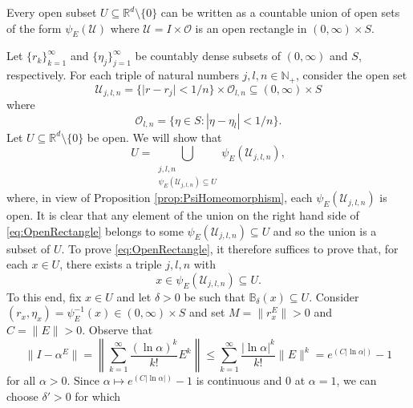 \documentclass[smallextended]{svjour3}
\theoremstyle{remark}
\renewenvironment{proof}[1][\proofname]{\renewcommand\xproofname{#1}\xproof}{\endxproof}
\begin{document}
\begin{lemma}\label{lem:OpenRectangle}
Every open subset $U\subseteq \mathbb{R}^d\setminus\{0\}$ can be written as a countable union of open sets of the form $\psi_E(\mathcal{U})$ where $\mathcal{U}=I\times\mathcal{O}$ is an open rectangle in $(0,\infty)\times S$.
\end{lemma}


\begin{proof}
Let $\{r_k\}_{k=1}^\infty$ and $\{\eta_j\}_{j=1}^\infty$ be countably dense subsets of $(0,\infty)$ and $S$, respectively.  For each triple of natural numbers $j,l,n\in\mathbb{N}_+$, consider the open set
\begin{equation*}
\mathcal{U}_{j,l,n}=\{ \vert r - r_j \vert < 1/n \}\times \mathcal{O}_{l,n}\subseteq (0,\infty)\times S
\end{equation*}
where
\begin{equation*}
\mathcal{O}_{l,n}=\{\eta\in S: |\eta-\eta_l|<1/n\}.
\end{equation*}
Let $U\subseteq \mathbb{R}^d\setminus \{0\}$ be open. We will show that
\begin{equation}\label{eq:OpenRectangle}
U=\bigcup_{\substack{j,l,n\\ \psi_E(\mathcal{U}_{j,l,n})\subseteq U}}\psi_E(\mathcal{U}_{j,l,n}),
\end{equation}
where, in view of Proposition \ref{prop:PsiHomeomorphism}, each $\psi_E(\mathcal{U}_{j,l,n})$ is open. It is clear that any element of the union on the right hand side of \eqref{eq:OpenRectangle} belongs to some $\psi_E(\mathcal{U}_{j,l,n}) \subseteq U$ and so the union is a subset of $U$. To prove \eqref{eq:OpenRectangle}, it therefore suffices to prove that, for each $x\in U$, there exists a triple $j,l,n$ with
\begin{equation*}
x\in\psi_E(\mathcal{U}_{j,l,n})\subseteq U.
\end{equation*}
To this end, fix $x\in U$ and let $\delta>0$ be such that $\mathbb{B}_\delta(x)\subseteq U$. Consider $(r_x,\eta_x)=\psi_E^{-1}(x)\in (0,\infty)\times S$ and set $M=\|r_x^E\|>0$ and $C=\|E\|>0$. Observe that 
\begin{equation*}
\|I-\alpha^E\|=\left\|\sum_{k=1}^\infty \frac{(\ln \alpha)^k}{k!} E^k\right\|\leq \sum_{k=1}^\infty \frac{|\ln \alpha|^k}{k!} \|E\|^k=e^{(C|\ln \alpha|)}-1
\end{equation*}
for all $\alpha>0$. Since $\alpha\mapsto e^{(C|\ln \alpha|)}-1$ is continuous and $0$ at $\alpha=1$, we can choose $\delta'>0$ for which
\begin{equation*}

\end{equation*}
\end{proof}
\end{document}
